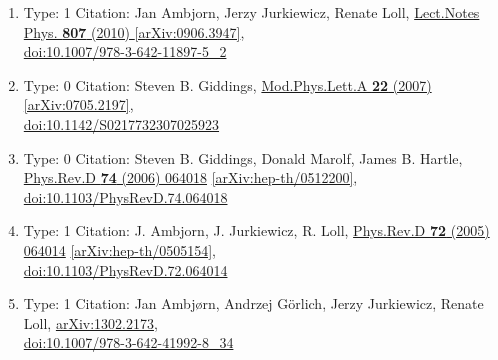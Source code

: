 \documentclass[a4paper,10pt]{article}
\begin{document}
\begin{enumerate}
\begin{enumerate}
  \item Type: 1 Citation: Jan Ambjorn, Jerzy Jurkiewicz, Renate Loll, \href{https://www.doi.org/10.1007/978-3-642-11897-5_2}{Lect.Notes Phys. {\bf 807} (2010) }  \href{https://arxiv.org/abs/0906.3947}{[arXiv:0906.3947]},\\\href{https://www.doi.org/10.1007/978-3-642-11897-5_2}{doi:10.1007/978-3-642-11897-5\_2}
  \item Type: 0 Citation: Steven B. Giddings, \href{https://www.doi.org/10.1142/S0217732307025923}{Mod.Phys.Lett.A {\bf 22} (2007) }  \href{https://arxiv.org/abs/0705.2197}{[arXiv:0705.2197]},\\\href{https://www.doi.org/10.1142/S0217732307025923}{doi:10.1142/S0217732307025923}
  \item Type: 0 Citation: Steven B. Giddings, Donald Marolf, James B. Hartle, \href{https://www.doi.org/10.1103/PhysRevD.74.064018}{Phys.Rev.D {\bf 74} (2006) 064018}  \href{https://arxiv.org/abs/hep-th/0512200}{[arXiv:hep-th/0512200]},\\\href{https://www.doi.org/10.1103/PhysRevD.74.064018}{doi:10.1103/PhysRevD.74.064018}
  \item Type: 1 Citation: J. Ambjorn, J. Jurkiewicz, R. Loll, \href{https://www.doi.org/10.1103/PhysRevD.72.064014}{Phys.Rev.D {\bf 72} (2005) 064014}  \href{https://arxiv.org/abs/hep-th/0505154}{[arXiv:hep-th/0505154]},\\\href{https://www.doi.org/10.1103/PhysRevD.72.064014}{doi:10.1103/PhysRevD.72.064014}
  \item Type: 1 Citation: Jan Ambjørn, Andrzej Görlich, Jerzy Jurkiewicz, Renate Loll, \href{https://arxiv.org/abs/1302.2173}{arXiv:1302.2173},\\\href{https://www.doi.org/10.1007/978-3-642-41992-8_34}{doi:10.1007/978-3-642-41992-8\_34}

\end{enumerate}
\end{enumerate}
\end{document}
